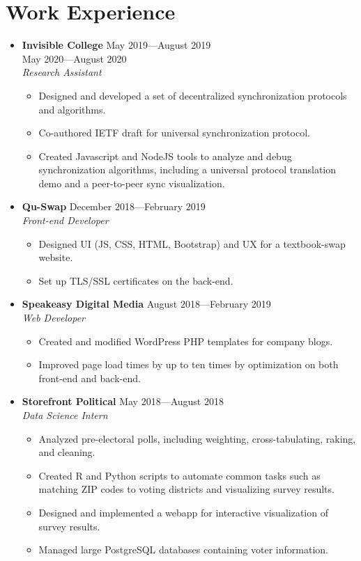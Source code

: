 \documentclass[12pt,letterpaper]{article}
\newenvironment{explist}
{\begin{itemize}[label=\textbf{--},itemsep=1pt,topsep=0pt,partopsep=0pt,parsep=0pt]}
{\end{itemize}}
\begin{document}
\section*{Work Experience} \vspace{-0.5em}
\begin{itemize}[label=,itemsep=0pt]
	\item 
	\textbf{Invisible College} \hfill May 2019---August 2019\\
    \null \hfill May 2020---August 2020\\
	\textit{Research Assistant}
	\begin{explist}
		\item Designed and developed a set of decentralized synchronization protocols and algorithms.
		\item Co-authored IETF draft for universal synchronization protocol.
		\item Created Javascript and NodeJS tools to analyze and debug synchronization algorithms, including a universal protocol translation demo and a peer-to-peer sync visualization.
	\end{explist}

	\item
	\textbf{Qu-Swap} \hfill December 2018---February 2019\\
	\textit{Front-end Developer}
	\begin{explist}
		\item Designed UI (JS, CSS, HTML, Bootstrap) and UX for a textbook-swap website.
		\item Set up TLS/SSL certificates on the back-end.
	\end{explist}

	\item
	\textbf{Speakeasy Digital Media} \hfill August 2018---February 2019\\
	\textit{Web Developer}
	\begin{explist}
		\item Created and modified WordPress PHP templates for company blogs.
		\item Improved page load times by up to ten times by optimization on both front-end and back-end.
	\end{explist}
	
	\item
	\textbf{Storefront Political} \hfill May 2018---August 2018\\
	\textit{Data Science Intern}
	\begin{explist}
		\item Analyzed pre-electoral polls, including weighting, cross-tabulating, raking, and cleaning.
		\item Created R and Python scripts to automate common tasks such as matching ZIP codes to voting districts and visualizing survey results.
		\item Designed and implemented a webapp for interactive visualization of survey results.
		\item Managed large PostgreSQL databases containing voter information.
	\end{explist}


\end{itemize}
\end{document}
